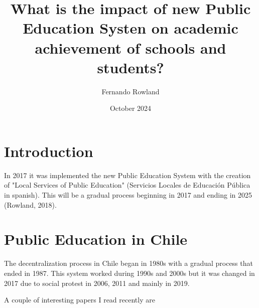\documentclass{article}
\title{What is the impact of new Public Education Systen on academic achievement of schools and students?}
\author{Fernando Rowland}
\date{October 2024}
\begin{document}
\maketitle

\section{Introduction}
In 2017 it was implemented the new Public Education System with the creation of "Local Services of Public Education" (Servicios Locales de Educación Pública in spanish). This will be a gradual process beginning in 2017 and ending in 2025 (Rowland, 2018).

\section{Public Education in Chile}
The decentralization process in Chile began in 1980s with a gradual process that ended in 1987. This system worked during 1990s and 2000s but it was changed in 2017 due to social protest in 2006, 2011 and mainly in 2019.


A couple of interesting papers I read recently are \cite{lopez_definicion_2018} 



\end{document}
